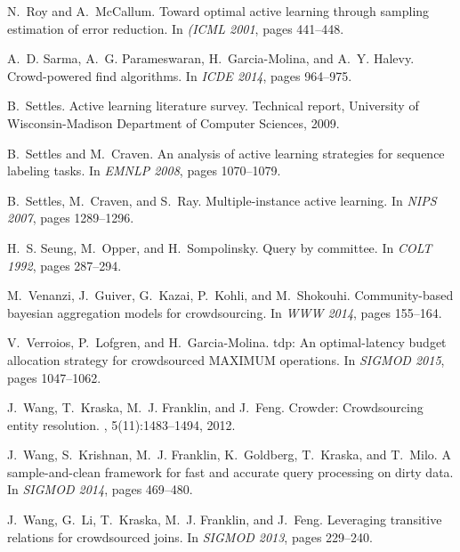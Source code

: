 \documentclass[11pt]{article}
\newcounter{alg}[section]
\begin{document}
\begin{thebibliography}{10}
	N.~Roy and A.~McCallum.
	\newblock Toward optimal active learning through sampling estimation of error
	reduction.
	\newblock In {\em {(ICML} 2001}, pages 441--448.
	
	A.~D. Sarma, A.~G. Parameswaran, H.~Garcia{-}Molina, and A.~Y. Halevy.
	\newblock Crowd-powered find algorithms.
	\newblock In {\em {ICDE} 2014}, pages 964--975.
	
	B.~Settles.
	\newblock Active learning literature survey.
	\newblock Technical report, University of Wisconsin-Madison Department of
	Computer Sciences, 2009.
	
	B.~Settles and M.~Craven.
	\newblock An analysis of active learning strategies for sequence labeling
	tasks.
	\newblock In {\em {EMNLP} 2008}, pages 1070--1079.
	
	B.~Settles, M.~Craven, and S.~Ray.
	\newblock Multiple-instance active learning.
	\newblock In {\em NIPS 2007}, pages 1289--1296.
	
	H.~S. Seung, M.~Opper, and H.~Sompolinsky.
	\newblock Query by committee.
	\newblock In {\em {COLT} 1992}, pages 287--294.
	
	M.~Venanzi, J.~Guiver, G.~Kazai, P.~Kohli, and M.~Shokouhi.
	\newblock Community-based bayesian aggregation models for crowdsourcing.
	\newblock In {\em {WWW} 2014}, pages 155--164.
	
	V.~Verroios, P.~Lofgren, and H.~Garcia{-}Molina.
	\newblock tdp: An optimal-latency budget allocation strategy for crowdsourced
	{MAXIMUM} operations.
	\newblock In {\em {SIGMOD} 2015}, pages 1047--1062.
	
	J.~Wang, T.~Kraska, M.~J. Franklin, and J.~Feng.
	\newblock Crowder: Crowdsourcing entity resolution.
	, 5(11):1483--1494, 2012.
	
	J.~Wang, S.~Krishnan, M.~J. Franklin, K.~Goldberg, T.~Kraska, and T.~Milo.
	\newblock A sample-and-clean framework for fast and accurate query processing
	on dirty data.
	\newblock In {\em {SIGMOD} 2014}, pages 469--480.
	
	J.~Wang, G.~Li, T.~Kraska, M.~J. Franklin, and J.~Feng.
	\newblock Leveraging transitive relations for crowdsourced joins.
	\newblock In {\em {SIGMOD} 2013}, pages 229--240.
	

\end{thebibliography}
\end{document}
